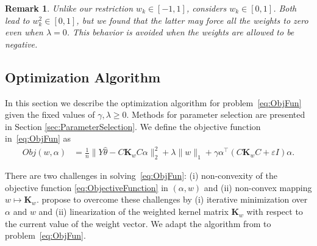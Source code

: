 \documentclass[twoside, onecolumn]{article}
\def\bK{\mathbf{K}}
\def\Score{\widehat{\theta}}
\newtheorem{remark}{Remark}
\begin{document}
\begin{remark} Unlike our restriction $w_k\in [-1,1]$,
\cite{allen_automatic_2013} considers $w_k \in [0,1]$. Both lead to $w_k^2\in [0,1]$, but we found that the latter may force all the weights to zero even when $\lambda = 0$. %
This behavior is avoided when the weights are allowed to be negative.
\end{remark}

\subsection{Optimization Algorithm}\label{sec:Algorithm}

In this section we describe the optimization algorithm for problem~\eqref{eq:ObjFun} given the fixed values of  $\gamma, \lambda\ge 0$. Methods for parameter selection are presented in Section \ref{sec:ParameterSelection}. We define the objective function in~\eqref{eq:ObjFun} as
\begin{equation}\label{eq:ObjectiveFunction}
\begin{split}
 Obj(w, \alpha)& = \frac{1}{n}\|Y\Score-C\mathbf{K}_wC\alpha\|_{2}^{2}+\lambda\|w\|_{1}+\gamma \alpha^{\top}(C\mathbf{K}_wC+\varepsilon I)\alpha.
 \end{split}
\end{equation} 

There are two challenges in solving~\eqref{eq:ObjFun}: (i) non-convexity of the objective function \eqref{eq:ObjectiveFunction} in $(\alpha, w)$ and (ii) non-convex mapping $w\mapsto \mathbf{K}_w$. \cite{allen_automatic_2013} propose to overcome these challenges by (i) iterative minimization over $\alpha$ 
and $w$ and (ii) linearization of the weighted kernel matrix $\bK_w$ with respect to the current value of the weight vector. We adapt the algorithm from \cite{allen_automatic_2013} to problem~\eqref{eq:ObjFun}.
\end{document}
